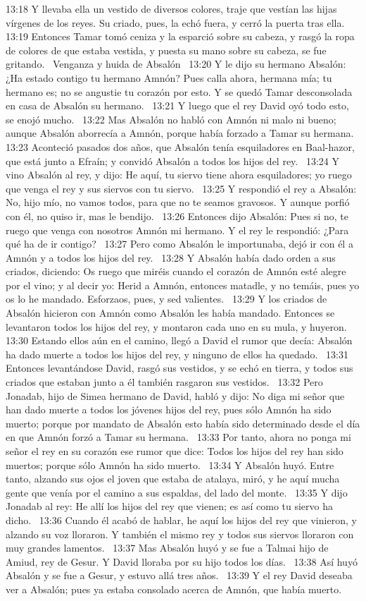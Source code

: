 13:18 Y llevaba ella un vestido de diversos colores, traje que vestían las hijas vírgenes de los reyes. Su criado, pues, la echó fuera, y cerró la puerta tras ella.  
13:19 Entonces Tamar tomó ceniza y la esparció sobre su cabeza, y rasgó la ropa de colores de que estaba vestida, y puesta su mano sobre su cabeza, se fue gritando.  
Venganza y huida de Absalón  
13:20 Y le dijo su hermano Absalón: ¿Ha estado contigo tu hermano Amnón? Pues calla ahora, hermana mía; tu hermano es; no se angustie tu corazón por esto. Y se quedó Tamar desconsolada en casa de Absalón su hermano.  
13:21 Y luego que el rey David oyó todo esto, se enojó mucho.  
13:22 Mas Absalón no habló con Amnón ni malo ni bueno; aunque Absalón aborrecía a Amnón, porque había forzado a Tamar su hermana.  
13:23 Aconteció pasados dos años, que Absalón tenía esquiladores en Baal-hazor, que está junto a Efraín; y convidó Absalón a todos los hijos del rey.  
13:24 Y vino Absalón al rey, y dijo: He aquí, tu siervo tiene ahora esquiladores; yo ruego que venga el rey y sus siervos con tu siervo.  
13:25 Y respondió el rey a Absalón: No, hijo mío, no vamos todos, para que no te seamos gravosos. Y aunque porfió con él, no quiso ir, mas le bendijo.  
13:26 Entonces dijo Absalón: Pues si no, te ruego que venga con nosotros Amnón mi hermano. Y el rey le respondió: ¿Para qué ha de ir contigo?  
13:27 Pero como Absalón le importunaba, dejó ir con él a Amnón y a todos los hijos del rey.  
13:28 Y Absalón había dado orden a sus criados, diciendo: Os ruego que miréis cuando el corazón de Amnón esté alegre por el vino; y al decir yo: Herid a Amnón, entonces matadle, y no temáis, pues yo os lo he mandado. Esforzaos, pues, y sed valientes.  
13:29 Y los criados de Absalón hicieron con Amnón como Absalón les había mandado. Entonces se levantaron todos los hijos del rey, y montaron cada uno en su mula, y huyeron.  
13:30 Estando ellos aún en el camino, llegó a David el rumor que decía: Absalón ha dado muerte a todos los hijos del rey, y ninguno de ellos ha quedado.  
13:31 Entonces levantándose David, rasgó sus vestidos, y se echó en tierra, y todos sus criados que estaban junto a él también rasgaron sus vestidos.  
13:32 Pero Jonadab, hijo de Simea hermano de David, habló y dijo: No diga mi señor que han dado muerte a todos los jóvenes hijos del rey, pues sólo Amnón ha sido muerto; porque por mandato de Absalón esto había sido determinado desde el día en que Amnón forzó a Tamar su hermana.  
13:33 Por tanto, ahora no ponga mi señor el rey en su corazón ese rumor que dice: Todos los hijos del rey han sido muertos; porque sólo Amnón ha sido muerto.  
13:34 Y Absalón huyó. Entre tanto, alzando sus ojos el joven que estaba de atalaya, miró, y he aquí mucha gente que venía por el camino a sus espaldas, del lado del monte.  
13:35 Y dijo Jonadab al rey: He allí los hijos del rey que vienen; es así como tu siervo ha dicho.  
13:36 Cuando él acabó de hablar, he aquí los hijos del rey que vinieron, y alzando su voz lloraron. Y también el mismo rey y todos sus siervos lloraron con muy grandes lamentos.  
13:37 Mas Absalón huyó y se fue a Talmai hijo de Amiud, rey de Gesur. Y David lloraba por su hijo todos los días.  
13:38 Así huyó Absalón y se fue a Gesur, y estuvo allá tres años.  
13:39 Y el rey David deseaba ver a Absalón; pues ya estaba consolado acerca de Amnón, que había muerto.  
